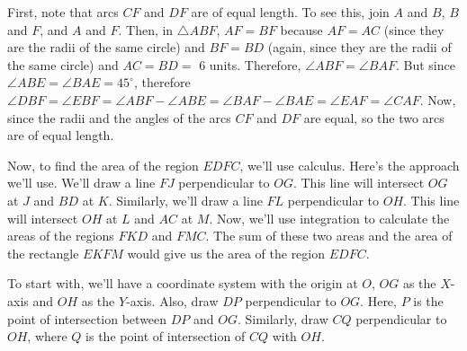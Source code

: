 \documentclass{article}
\begin{document}
First, note that arcs $CF$ and $DF$ are of equal length. To see this, join $A$ and $B$, $B$ and $F$, and $A$ and $F$. Then, in $\triangle ABF$, $AF = BF$ because $AF = AC$ (since they are the radii of the same circle) and $BF = BD$ (again, since they are the radii of the same circle) and $AC = BD =$ 6 units. Therefore, $\angle ABF = \angle BAF$. But since $\angle ABE = \angle BAE = 45^\circ$, therefore $\angle DBF = \angle EBF = \angle ABF - \angle ABE = \angle BAF - \angle BAE = \angle EAF = \angle CAF$. Now, since the radii and the angles of the arcs $CF$ and $DF$ are equal, so the two arcs are of equal length.

Now, to find the area of the region $EDFC$, we'll use calculus. Here's the approach we'll use. We'll draw a line $FJ$ perpendicular to $OG$. This line will intersect $OG$ at $J$ and $BD$ at $K$. Similarly, we'll draw a line $FL$ perpendicular to $OH$. This line will intersect $OH$ at $L$ and $AC$ at $M$. Now, we'll use integration to calculate the areas of the regions $FKD$ and $FMC$. The sum of these two areas and the area of the rectangle $EKFM$ would give us the area of the region $EDFC$.

To start with, we'll have a coordinate system with the origin at $O$, $OG$ as the $X$-axis and $OH$ as the $Y$-axis. Also, draw $DP$ perpendicular to $OG$. Here, $P$ is the point of intersection between $DP$ and $OG$. Similarly, draw $CQ$ perpendicular to $OH$, where $Q$ is the point of intersection of $CQ$ with $OH$.
\end{document}
